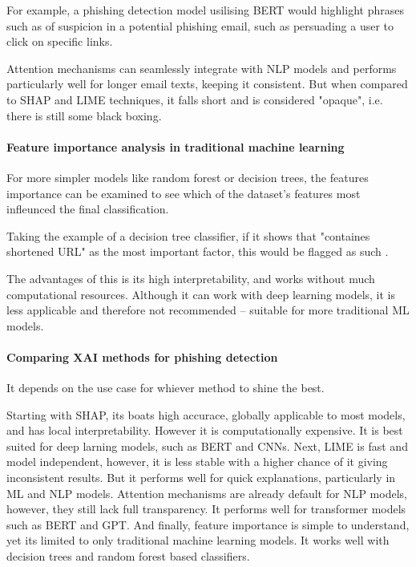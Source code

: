 \noindent For example, a phishing detection model usilising BERT would highlight phrases such as of suspicion in a potential phishing email, such as persuading a user to click on specific links.\newline

\noindent Attention mechanisms can seamlessly integrate with NLP models and performs particularly well for longer email texts, keeping it consistent. But when compared to SHAP and LIME techniques, it falls short and is considered "opaque", i.e. there is still some black boxing.

\paragraph{Feature importance analysis in traditional machine learning}
For more simpler models like random forest or decision trees, the features importance can be examined to see which of the dataset's features most infleunced the final classification.\newline

\noindent Taking the example of a decision tree classifier, if it shows that "containes shortened URL" as the most important factor, this would be flagged as such \citep{bountakas2023helphed}.\newline

\noindent The advantages of this is its high interpretability, and works without much computational resources. Although it can work with deep learning models, it is less applicable and therefore not recommended -- suitable for more traditional ML models.

\paragraph{Comparing XAI methods for phishing detection}
It depends on the use case for whiever method to shine the best.\newline

\noindent Starting with SHAP, its boats high accurace, globally applicable to most models, and has local interpretability. However it is computationally expensive. It is best suited for deep larning models, such as BERT and CNNs. Next, LIME is fast and model independent, however, it is less stable with a higher chance of it giving inconsistent results. But it performs well for quick explanations, particularly in ML and NLP models. Attention mechanisms are already default for NLP models, however, they still lack full transparency. It performs well for transformer models such as BERT and GPT. And finally, feature importance is simple to understand, yet its limited to only traditional machine learning models. It works well with decision trees and random forest based classifiers.


